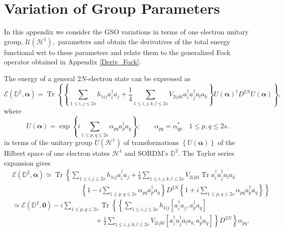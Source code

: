 \documentclass[aps,preprint]{revtex4}%
\begin{document}
\section{Variation of Group Parameters\label{VarGroupPar}}

In this appendix we consider the GSO variations in terms of one electron
unitary group, $\mathcal{U}\left(  \mathcal{H}^{1}\right)  ,$ parameters and
obtain the derivatives of the total energy functional wrt to these parameters
and relate them to the generalized Fock operator obtained in Appendix
\ref{Deriv_Fock}.

The energy of a general $2N$-electron state can be expressed as
\begin{equation}
\mathcal{E}\left(  \mathbb{D}^{2},\bm{\alpha}\right)  =\operatorname{Tr}%
\left\{  \left\{  \sum_{1\leq i,j\leq2s}h_{1ij}a_{i}^{\dagger}a_{j}+\frac
{1}{4}\sum_{1\leq i,j,k,l\leq2s}V_{2ijkl}a_{i}^{\dagger}a_{j}^{\dagger}%
a_{l}a_{k}\right\}  U\left(  \bm{\alpha}\right)  ^{\dagger}D^{2N}U\left(
\bm{\alpha}\right)  \right\}  ,
\end{equation}
where
\begin{equation}
U\left(  \bm{\alpha}\right)  =\exp\left\{  i\sum_{1\leq p,q\leq2s}\alpha
_{pq}a_{p}^{\dagger}a_{q}\right\}  ;\qquad\alpha_{pq}=\alpha_{qp}^{\ast}%
\quad1\leq p,q\leq2s.
\end{equation}
in terms of the unitary group $U\left(  \mathcal{H}^{1}\right)  $ of
transformations $\left\{  U\left(  \bm{\alpha}\right)  \right\}  $ of the
Hilbert space of one electron states $\mathcal{H}^{1}$ and SORDM's
$\mathbb{D}^{2}$. The Taylor series expansion gives
\begin{align}
&  \mathcal{E}\left(  \mathbb{D}^{2},\bm{\alpha}\right)  \simeq
\operatorname{Tr}\left\{  \sum_{1\leq i,j\leq2s}h_{1ij}a_{i}^{\dagger}%
a_{j}+\frac{1}{4}\sum_{1\leq i,j,k,l\leq2s}V_{2ijkl}\operatorname{Tr}%
a_{i}^{\dagger}a_{j}^{\dagger}a_{l}a_{k}\right. \nonumber\\
&  \qquad\qquad\qquad\qquad\qquad\left.  \left\{  1-i\sum_{1\leq p,q\leq
2s}\alpha_{pq}a_{p}^{\dagger}a_{q}\right\}  D^{2N}\left\{  1+i\sum_{1\leq
p,q\leq2s}\alpha_{pq}a_{p}^{\dagger}a_{q}\right\}  \right\} \nonumber\\
&  \simeq\mathcal{E}\left(  \mathbb{D}^{2},\bm{0}\right)  -i\sum_{1\leq
p,q\leq2s}\operatorname{Tr}\left\{  \left\{  \sum_{1\leq i,j\leq2s}%
h_{1ij}\left[  a_{i}^{\dagger}a_{j},a_{p}^{\dagger}a_{q}\right]  \right.
\right. \nonumber\\
&  \qquad\qquad\qquad\qquad\qquad\qquad+\left.  \left.  \frac{1}{4}\sum_{1\leq
i,j,k,l\leq2s}V_{2ijkl}\left[  a_{i}^{\dagger}a_{j}^{\dagger}a_{l}a_{k,}%
a_{p}^{\dagger}a_{q}\right]  \right\}  D^{2N}\right\}  \alpha_{pq}.
\end{align}
\end{document}
